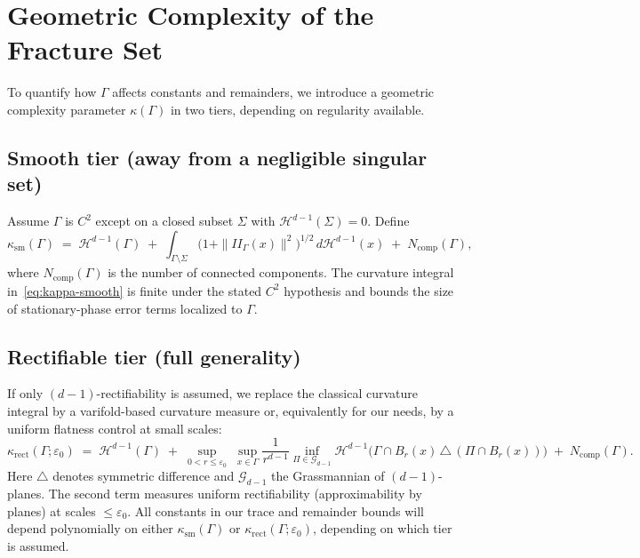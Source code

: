 \section{Geometric Complexity of the Fracture Set}
\label{sec:intro-kappa}

To quantify how $\Gamma$ affects constants and remainders, we introduce a
geometric complexity parameter $\kappa(\Gamma)$ in two tiers, depending on
regularity available.

\subsection{Smooth tier (away from a negligible singular set)}
\label{subsec:intro-kappa-smooth}
Assume $\Gamma$ is $C^{2}$ except on a closed subset $\Sigma$ with
$\mathcal{H}^{d-1}(\Sigma)=0$.
Define
\begin{equation}
\label{eq:kappa-smooth}
\kappa_{\mathrm{sm}}(\Gamma)
\;=\;
\mathcal{H}^{d-1}(\Gamma)
\;+\;
\int_{\Gamma\setminus\Sigma} \bigl( 1 + \|II_\Gamma(x)\|^2 \bigr)^{1/2}\,d\mathcal{H}^{d-1}(x)
\;+\; N_{\mathrm{comp}}(\Gamma),
\end{equation}
where $N_{\mathrm{comp}}(\Gamma)$ is the number of connected components.
The curvature integral in~\eqref{eq:kappa-smooth} is finite under the stated
$C^{2}$ hypothesis and bounds the size of stationary-phase error terms localized
to $\Gamma$.

\subsection{Rectifiable tier (full generality)}
\label{subsec:intro-kappa-rect}
If only $(d-1)$-rectifiability is assumed, we replace the classical curvature
integral by a varifold-based curvature measure or, equivalently for our needs,
by a uniform flatness control at small scales:
\begin{equation}
\label{eq:kappa-rect}
\kappa_{\mathrm{rect}}(\Gamma;\varepsilon_0)
\;=\;
\mathcal{H}^{d-1}(\Gamma)
\;+\;
\sup_{0<r\le \varepsilon_0}\;
\sup_{x\in\Gamma}
\frac{1}{r^{d-1}}
\inf_{\Pi\in\mathcal{G}_{d-1}}
\mathcal{H}^{d-1}\bigl(\Gamma\cap B_r(x)\,\triangle\,(\Pi\cap B_r(x))\bigr)
\;+\;N_{\mathrm{comp}}(\Gamma).
\end{equation}
Here $\triangle$ denotes symmetric difference and $\mathcal{G}_{d-1}$ the
Grassmannian of $(d-1)$-planes. The second term measures uniform rectifiability
(approximability by planes) at scales $\le \varepsilon_0$. All constants in our
trace and remainder bounds will depend polynomially on either
$\kappa_{\mathrm{sm}}(\Gamma)$ or $\kappa_{\mathrm{rect}}(\Gamma;\varepsilon_0)$,
depending on which tier is assumed.

